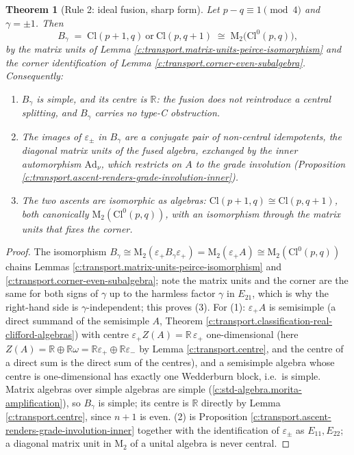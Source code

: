 \documentclass[11pt]{article}
\newtheorem{theorem}{Theorem}[section]
\theoremstyle{definition}
\theoremstyle{plain}
\providecommand{\Cl}{}\renewcommand{\Cl}{\mathrm{Cl}}
\providecommand{\Mat}{}\renewcommand{\Mat}{\mathrm{M}}
\providecommand{\R}{}\renewcommand{\R}{\mathbb{R}}
\begin{document}
\begin{theorem}[Rule 2: ideal fusion, sharp form]\label{c:transport.rule-2-ideal-fusion-sharp-form}
Let $p - q \equiv 1 \pmod 4$ and $\gamma = \pm 1$. Then
\[
B_\gamma \;=\; \Cl(p{+}1,q) \ \text{or}\ \Cl(p,q{+}1) \;\cong\; \Mat_2\bigl(\Cl^0(p,q)\bigr),
\]
by the matrix units of Lemma \ref{c:transport.matrix-units-peirce-isomorphism} and the corner identification of Lemma \ref{c:transport.corner-even-subalgebra}. Consequently:
\begin{enumerate}
\item $B_\gamma$ is simple, and its centre is $\R$: the fusion does not reintroduce a central splitting, and $B_\gamma$ carries no type-C obstruction.
\item The images of $\varepsilon_\pm$ in $B_\gamma$ are a conjugate pair of non-central idempotents, the diagonal matrix units of the fused algebra, exchanged by the inner automorphism $\mathrm{Ad}_\nu$, which restricts on $A$ to the grade involution (Proposition \ref{c:transport.ascent-renders-grade-involution-inner}).
\item The two ascents are isomorphic as algebras: $\Cl(p{+}1,q) \cong \Cl(p,q{+}1)$, both canonically $\Mat_2(\Cl^0(p,q))$, with an isomorphism through the matrix units that fixes the corner.
\end{enumerate}
\end{theorem}
\begin{proof}
The isomorphism $B_\gamma \cong \Mat_2(\varepsilon_+ B_\gamma \varepsilon_+) = \Mat_2(\varepsilon_+ A) \cong \Mat_2(\Cl^0(p,q))$ chains Lemmas \ref{c:transport.matrix-units-peirce-isomorphism} and \ref{c:transport.corner-even-subalgebra}; note the matrix units and the corner are the same for both signs of $\gamma$ up to the harmless factor $\gamma$ in $E_{21}$, which is why the right-hand side is $\gamma$-independent; this proves (3). For (1): $\varepsilon_+ A$ is semisimple (a direct summand of the semisimple $A$, Theorem \ref{c:transport.classification-real-clifford-algebras}) with centre $\varepsilon_+ Z(A) = \R\,\varepsilon_+$ one-dimensional (here $Z(A) = \R \oplus \R\omega = \R\varepsilon_+ \oplus \R\varepsilon_-$ by Lemma \ref{c:transport.centre}, and the centre of a direct sum is the direct sum of the centres), and a semisimple algebra whose centre is one-dimensional has exactly one Wedderburn block, i.e.\ is simple. Matrix algebras over simple algebras are simple (\ref{c:std-algebra.morita-amplification}), so $B_\gamma$ is simple; its centre is $\R$ directly by Lemma \ref{c:transport.centre}, since $n + 1$ is even. (2) is Proposition \ref{c:transport.ascent-renders-grade-involution-inner} together with the identification of $\varepsilon_\pm$ as $E_{11}, E_{22}$; a diagonal matrix unit in $\Mat_2$ of a unital algebra is never central.

\end{proof}
\end{document}
